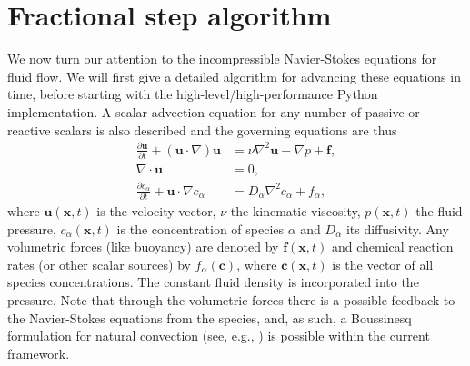 \documentclass[final,3p,times,twocolumn]{elsarticle}
\newcounter{bla}
\begin{document}
\section{Fractional step algorithm}
\label{sec:frac_step}
We now turn our attention to the incompressible Navier-Stokes equations for fluid flow. We will first give a detailed algorithm for advancing these equations in time, before starting with the high-level/high-performance Python implementation. A scalar advection equation for any number of passive or reactive scalars is also described and the governing equations are thus
\begin{align}
  \frac{\partial \bm{u}}{\partial t} + (\bm{u} \cdot \nabla) \bm{u} &= \nu \nabla^2 \bm{u} - \nabla p + \bm{f}, \label{eq:NS} \\
  \nabla \cdot \bm{u} &= 0, \label{eq:div} \\
  \frac{\partial c_{\alpha}}{\partial t} + \bm{u} \cdot \nabla c_{\alpha} &= D_{\alpha} \nabla^2 c_{\alpha} + f_{\alpha}, \label{eq:scalar}
\end{align}
where $\bm{u}(\bm{x}, t)$ is the velocity vector, $\nu$ the kinematic viscosity, $p(\bm{x}, t)$ the fluid pressure, $c_{\alpha}(\bm{x}, t)$ is the concentration of species $\alpha$ and $D_{\alpha}$ its diffusivity. Any volumetric forces (like buoyancy) are denoted by $\bm{f}(\bm{x}, t)$ and chemical reaction rates (or other scalar sources) by $f_{\alpha}(\bm{c})$, where $\bm{c}(\bm{x}, t)$ is the vector of all species concentrations. The constant fluid density is incorporated into the pressure. Note that through the volumetric forces there is a possible feedback to the Navier-Stokes equations from the species, and, as such, a Boussinesq formulation for natural convection (see, e.g., \cite{christon02}) is possible within the current framework.
\end{document}
